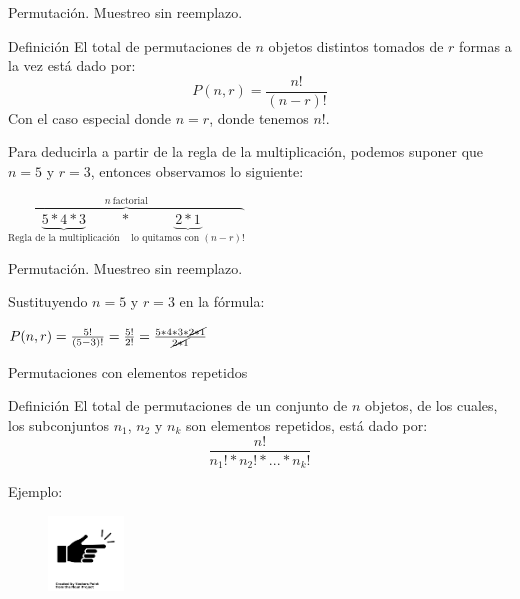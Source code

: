 \documentclass{beamer}
\begin{document}
\begin{frame}{Permutación. Muestreo sin reemplazo.}
  
  \begin{block}{Definición}
    El total de permutaciones de $n$ objetos distintos tomados de $r$ formas a la
    vez está dado por:
    \begin{equation}
        P(n,r) =  \frac{n !}{(n - r)!}
    \end{equation}
    Con el caso especial donde $n=r$, donde tenemos $n!$.
  \end{block}
    Para deducirla a partir de la regla de la multiplicación, podemos suponer que
    $n=5$ y $r=3$, entonces observamos lo siguiente:
  
  \begin{block}{}
    \centering
    $\overbrace{\underbrace{5*4*3}_{\text{Regla de la multiplicación}} *
    \underbrace{2*1}_{\text{lo quitamos con } (n-r)!}}^{n \ \text{factorial}}$
  \end{block}
  
\end{frame}

\begin{frame}{Permutación. Muestreo sin reemplazo.}
  
  Sustituyendo $n=5$ y $r=3$ en la fórmula:
  
  \begin{block}{}
    \centering
    $P(n,r) =  \frac{5 !}{(5 - 3)!} = \frac{5 !}{2!} 
            = \frac{5*4*3* \cancel{2*1}}{\cancel{2*1}} $
  \end{block}
  
\end{frame}

\begin{frame}{Permutaciones con elementos repetidos}
  \begin{block}{Definición}
    El total de permutaciones de un conjunto de $n$ objetos, de los cuales, los
    subconjuntos $n_1$, $n_2$ y $n_k$ son elementos repetidos, está dado por:
  \begin{equation}
    \frac{n!}{n_{1}!*n_{2}!*...*n_{k}!}
    \label{eq:permutar}
  \end{equation}
  \end{block}

  Ejemplo:
  \begin{figure}
    \includegraphics[width=2cm,angle=0,trim={1mm 216mm 1mm 200mm},clip]{figures/example-finger.png}
  \end{figure}
\end{frame}
\end{document}
